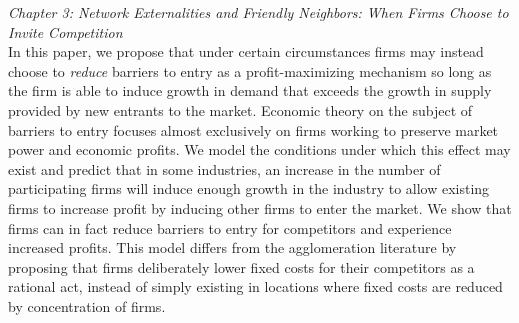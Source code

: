 \begin{adjustwidth}{-5em}{5em}
\textit{Chapter 3: Network Externalities and Friendly Neighbors: When Firms Choose to Invite Competition}\\

In this paper, we propose that under certain circumstances firms may instead choose to \emph{reduce} barriers to entry as a profit-maximizing mechanism so long as the firm is able to induce growth in demand that exceeds the growth in supply provided by new entrants to the market. Economic theory on the subject of barriers to entry focuses almost exclusively on firms working to preserve market power and economic profits. We model the conditions under which this effect may exist and predict that in some industries, an increase in the number of participating firms will induce enough growth in the industry to allow existing firms to increase profit by inducing other firms to enter the market. We show that firms can in fact reduce barriers to entry for competitors and experience increased profits. This model differs from the agglomeration literature by proposing that firms deliberately lower fixed costs for their competitors as a rational act, instead of simply existing in locations where fixed costs are reduced by concentration of firms.

\end{adjustwidth}